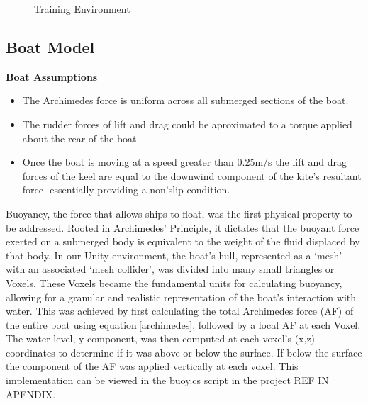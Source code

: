 \begin{figure}[h]
    \centering
    \caption{Training Environment}\label{training_enviroment}
\end{figure}


\subsection{Boat Model}\label{sec:Boat}

\textbf{Boat Assumptions}
\begin{itemize}
    \item The Archimedes force is uniform across all submerged sections of the boat.
    \item The rudder forces of lift and drag could be aproximated to a torque applied about the rear of the boat.
    \item Once the boat is moving at a speed greater than 0.25m/s the lift and drag forces of the keel are equal to the downwind component of the kite's resultant force- essentially providing a non'slip condition.
\end{itemize}
Buoyancy, the force that allows ships to float, was the first physical property to be addressed. Rooted in Archimedes' Principle, it dictates that the buoyant force exerted on a submerged body is equivalent to the weight of the fluid displaced by that body. In our Unity environment, the boat's hull, represented as a `mesh' with an associated `mesh collider', was divided into many small triangles or Voxels. These Voxels became the fundamental units for calculating buoyancy, allowing for a granular and realistic representation of the boat's interaction with water. This was achieved by first calculating the total Archimedes force (AF) of the entire boat using equation$~$\ref{archimedes}, followed by a local AF at each Voxel. The water level, y component, was then computed at each voxel's (x,z) coordinates to determine if it was above or below the surface. If below the surface the component of the AF was applied vertically at each voxel. This implementation can be viewed in the buoy.cs script in the project REF IN APENDIX.

